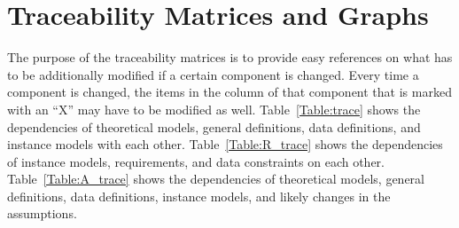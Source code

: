 \documentclass[12pt]{article}
\begin{document}
\section{Traceability Matrices and Graphs}

The purpose of the traceability matrices is to provide easy references on what
has to be additionally modified if a certain component is changed.  Every time a
component is changed, the items in the column of that component that is marked
with an ``X'' may have to be modified as well.  Table~\ref{Table:trace} shows the
dependencies of theoretical models, general definitions, data definitions, and
instance models with each other. Table~\ref{Table:R_trace} shows the
dependencies of instance models, requirements, and data constraints on each
other. Table~\ref{Table:A_trace} shows the dependencies of theoretical models,
general definitions, data definitions, instance models, and likely changes in
the assumptions.
\end{document}
